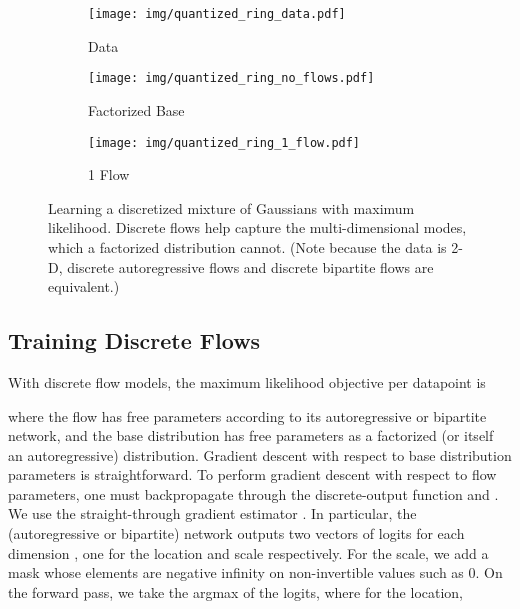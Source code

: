 \documentclass{article}
\begin{document}
\begin{figure}[t!]
\centering
\begin{subfigure}[t]{0.3\textwidth}
\centering
\texttt{[image: img/quantized\_ring\_data.pdf]}
\caption{Data}
\end{subfigure}\hfill \begin{subfigure}[t]{0.3\textwidth}
\centering
\texttt{[image: img/quantized\_ring\_no\_flows.pdf]}
\caption{Factorized Base}
\end{subfigure}\hfill \begin{subfigure}[t]{0.3\textwidth}
\centering
\texttt{[image: img/quantized\_ring\_1\_flow.pdf]}
\caption{1 Flow}
\end{subfigure}
\caption{Learning a discretized mixture of Gaussians with maximum likelihood. Discrete flows help capture the multi-dimensional modes, which a factorized distribution cannot. (Note because the data is 2-D, discrete autoregressive flows and discrete bipartite flows are equivalent.)}
\label{fig:flow-mixtures}
\end{figure}



















\subsection{Training Discrete Flows}
With discrete flow models,
the maximum likelihood objective per datapoint is

where the flow  has free parameters according to its autoregressive or bipartite network, and the base distribution  has free parameters as a factorized (or itself an autoregressive) distribution. Gradient descent with respect to base distribution parameters is straightforward. To perform gradient descent with respect to flow parameters, one must backpropagate through the discrete-output function  and . We use the straight-through gradient estimator \citep{bengio2013estimating}. In particular, the (autoregressive or bipartite) network outputs two vectors of  logits  for each dimension , one for the location and scale respectively. For the scale, we add a mask whose elements are negative infinity on non-invertible values such as 0. On the forward pass, we take the argmax of the logits, where for the location,
\end{document}
